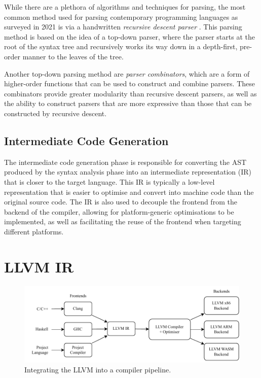 While there are a plethora of algorithms and techniques for parsing, the most common method used for
parsing contemporary programming languages as surveyed in 2021 is via a handwritten \emph{recursive
    descent parser} \autocite{eaton2021parser}. This parsing method is based on the idea of a top-down
parser, where the parser starts at the root of the syntax tree and recursively works its way down in
a depth-first, pre-order manner to the leaves of the tree.

Another top-down parsing method are \emph{parser combinators}, which are a form of higher-order
functions that can be used to construct and combine parsers. These combinators provide greater
modularity than recursive descent parsers, as well as the ability to construct parsers that are more
expressive than those that can be constructed by recursive descent.

\subsection{Intermediate Code Generation}

The intermediate code generation phase is responsible for converting the AST produced by the syntax
analysis phase into an intermediate representation (IR) that is closer to the target language. This
IR is typically a low-level representation that is easier to optimise and convert into machine code
than the original source code. The IR is also used to decouple the frontend from the backend of the
compiler, allowing for platform-generic optimisations to be implemented, as well as facilitating the
reuse of the frontend when targeting different platforms.

\section{LLVM IR}

\begin{figure}[b]
    \centering
    \includegraphics[width=\textwidth]{Graphics/llvm}
    \caption{Integrating the LLVM into a compiler pipeline.}
    \label{fig:llvm}
\end{figure}

